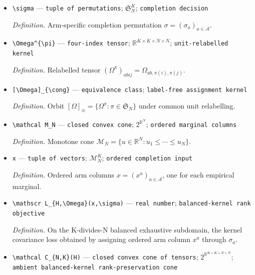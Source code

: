 \documentclass{article}
\begin{document}
\begin{itemize}
  \item \texttt{\textbackslash{}\allowbreak{}sigma} --- \texttt{tuple of permutations}; \(\mathfrak S_N^K\); \texttt{completion decision}
  \par\smallskip\noindent\emph{Definition.} Arm-specific completion permutation \(\sigma=(\sigma_a)_{a\in\mathcal A}\).
  \item \texttt{\textbackslash{}\allowbreak{}Omega\textasciicircum{}\{\textbackslash{}\allowbreak{}pi\}\allowbreak{}} --- \texttt{four-\allowbreak{}index tensor}; \(\mathbb R^{K\times K\times N\times N}\); \texttt{unit-\allowbreak{}relabelled kernel}
  \par\smallskip\noindent\emph{Definition.} Relabelled tensor \((\Omega^{\pi})_{abij}=\Omega_{ab,\pi(i),\pi(j)}\).
  \item \texttt{[\textbackslash{}\allowbreak{}Omega]\_\allowbreak{}\{\textbackslash{}\allowbreak{}cong\}\allowbreak{}} --- \texttt{equivalence class}; \texttt{label-\allowbreak{}free assignment kernel}
  \par\smallskip\noindent\emph{Definition.} Orbit \([\Omega]_{\cong}=\{\Omega^{\pi}:\pi\in\mathfrak S_N\}\) under common unit relabelling.
  \item \texttt{\textbackslash{}\allowbreak{}mathcal M\_\allowbreak{}N} --- \texttt{closed convex cone}; \(2^{\mathbb R^N}\); \texttt{ordered marginal columns}
  \par\smallskip\noindent\emph{Definition.} Monotone cone \(\mathcal M_N=\{u\in\mathbb R^N:u_1\leq\cdots\leq u_N\}\).
  \item \texttt{x} --- \texttt{tuple of vectors}; \(\mathcal M_N^K\); \texttt{ordered completion input}
  \par\smallskip\noindent\emph{Definition.} Ordered arm columns \(x=(x^a)_{a\in\mathcal A}\), one for each empirical marginal.
  \item \texttt{\textbackslash{}\allowbreak{}mathscr L\_\allowbreak{}\{H,\allowbreak{}\textbackslash{}\allowbreak{}Omega\}\allowbreak{}(x,\allowbreak{}\textbackslash{}\allowbreak{}sigma)} --- \texttt{real number}; \texttt{balanced-\allowbreak{}kernel rank objective}
  \par\smallskip\noindent\emph{Definition.} On the K-divides-N balanced exhaustive subdomain, the kernel covariance loss obtained by assigning ordered arm column \(x^a\) through \(\sigma_a\).
  \item \texttt{\textbackslash{}\allowbreak{}mathcal C\_\allowbreak{}\{N,\allowbreak{}K\}\allowbreak{}(H)} --- \texttt{closed convex cone of tensors}; \(2^{\mathbb R^{K\times K\times N\times N}}\); \texttt{ambient balanced-\allowbreak{}kernel rank-\allowbreak{}preservation cone}

\end{itemize}
\end{document}
